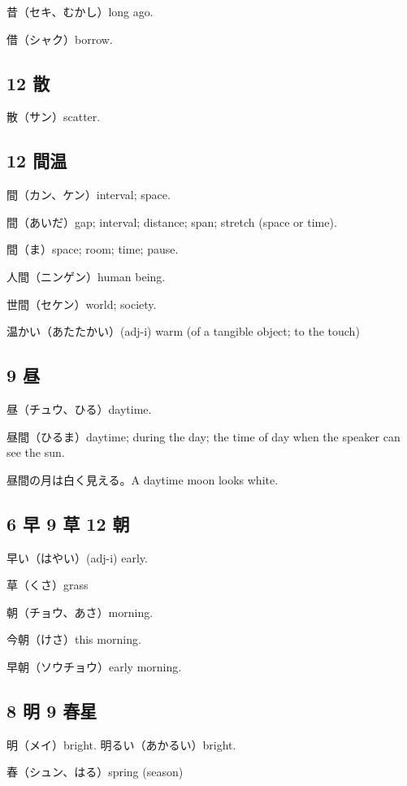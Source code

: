 昔（セキ、むかし）long ago.

借（シャク）borrow.

\subsection{12 散}

散（サン）scatter.

\subsection{12 間温}

間（カン、ケン）interval; space.

間（あいだ）gap; interval; distance; span; stretch (space or time).

間（ま）space; room; time; pause.

人間（ニンゲン）human being.

世間（セケン）world; society.

温かい（あたたかい）(adj-i) warm (of a tangible object; to the touch)

\subsection{9 昼}

昼（チュウ、ひる）daytime.

昼間（ひるま）daytime; during the day;
the time of day when the speaker can see the sun.

昼間の月は白く見える。A daytime moon looks white.

\subsection{6 早 9 草 12 朝}

早い（はやい）(adj-i) early.

草（くさ）grass

朝（チョウ、あさ）morning.

今朝（けさ）this morning.

早朝（ソウチョウ）early morning.

\subsection{8 明 9 春星}

明（メイ）bright.
明るい（あかるい）bright.

春（シュン、はる）spring (season)

